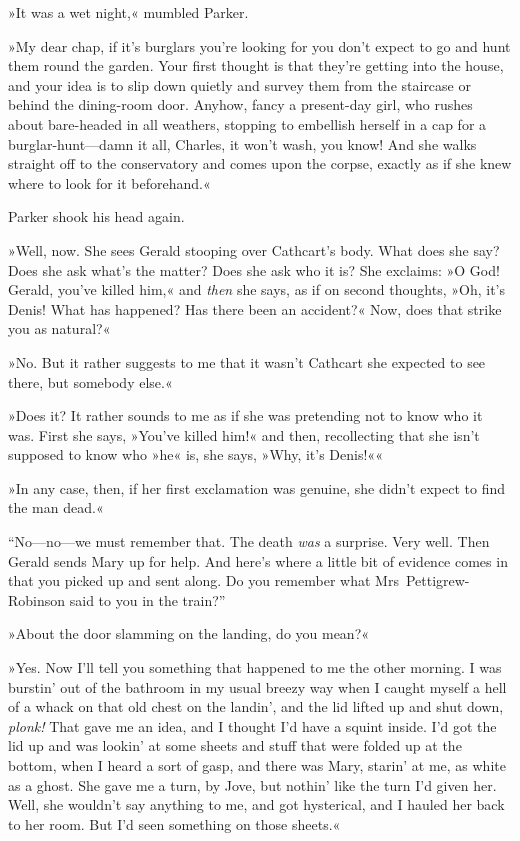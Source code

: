 »It was a wet night,« mumbled Parker.

»My dear chap, if it's burglars you're looking for you don't expect to go and hunt them round the garden. Your first thought is that they're getting into the house, and your idea is to slip down quietly and survey them from the staircase or behind the dining-room door. Anyhow, fancy a present-day girl, who rushes about bare-headed in all weathers, stopping to embellish herself in a cap for a burglar-hunt—damn it all, Charles, it won't wash, you know! And she walks straight off to the conservatory and comes upon the corpse, exactly as if she knew where to look for it beforehand.«

Parker shook his head again.

»Well, now. She sees Gerald stooping over Cathcart's body. What does she say? Does she ask what's the matter? Does she ask who it is? She exclaims: »O God! Gerald, you've killed him,« and \textit{then} she says, as if on second thoughts, »Oh, it's Denis! What has happened? Has there been an accident?« Now, does that strike you as natural?«

»No. But it rather suggests to me that it wasn't Cathcart she expected to see there, but somebody else.«

»Does it? It rather sounds to me as if she was pretending not to know who it was. First she says, »You've killed him!« and then, recollecting that she isn't supposed to know who »he« is, she says, »Why, it's Denis!««

»In any case, then, if her first exclamation was genuine, she didn't expect to find the man dead.«

\enquote{No—no—we must remember that. The death \textit{was} a surprise. Very well.  Then Gerald sends Mary up for help. And here's where a little bit of evidence comes in that you picked up and sent along. Do you remember what Mrs~Pettigrew-Robinson said to you in the train?}

»About the door slamming on the landing, do you mean?«

»Yes. Now I'll tell you something that happened to me the other morning. I was burstin' out of the bathroom in my usual breezy way when I caught myself a hell of a whack on that old chest on the landin', and the lid lifted up and shut down, \textit{plonk!} That gave me an idea, and I thought I'd have a squint inside. I'd got the lid up and was lookin' at some sheets and stuff that were folded up at the bottom, when I heard a sort of gasp, and there was Mary, starin' at me, as white as a ghost.  She gave me a turn, by Jove, but nothin' like the turn I'd given her.  Well, she wouldn't say anything to me, and got hysterical, and I hauled her back to her room. But I'd seen something on those sheets.«

